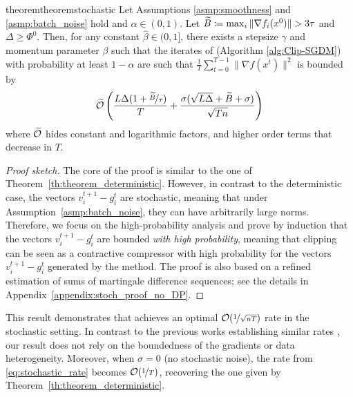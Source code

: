 \documentclass[a4paper,11pt]{article}
\begin{document}
\begin{restatable}[Simplified]{theorem}{theoremstochastic}\label{th:theorem_stochastic}
    Let Assumptions \ref{asmp:smoothness} and \ref{asmp:batch_noise} hold and $\alpha \in (0,1)$.  Let $\widetilde{B} \coloneqq \max_i\|\nabla f_i(x^0)\| > 3\tau$ and $\Delta \ge \Phi^0.$ Then, for any constant $\hat{\beta}\in (0,1]$, there exists a stepsize $\gamma$ and momentum parameter $\beta$ such that the iterates of  (Algorithm \ref{alg:Clip-SGDM}) with probability at least $1-\alpha$ are such that $\frac{1}{T}\sum_{t=0}^{T-1}\|\nabla f(x^t)\|^2$ is bounded by
    \begin{equation}
        \widetilde{\mathcal O}\left(\frac{L\Delta(1 + \nicefrac{\widetilde{B}}{\tau})}{T} 
        + \frac{\sigma(\sqrt{L\Delta} + \widetilde{B}+\sigma)}{\sqrt{Tn}}\right) \label{eq:stochastic_rate}
    \end{equation}
    where $\widetilde{\mathcal O}$ hides constant and logarithmic factors, and higher order terms that decrease in $T$.
\end{restatable}
\begin{proof}[Proof sketch]
    The core of the proof is similar to the one of Theorem~\ref{th:theorem_deterministic}. However, in contrast to the deterministic case, the vectors $v_i^{t+1} - g_i^t$ are stochastic, meaning that under Assumption~\ref{asmp:batch_noise}, they can have arbitrarily large norms. Therefore, we focus on the high-probability analysis and prove by induction that the vectors $v_i^{t+1} - g_i^t$ are bounded \emph{with high probability}, meaning that clipping can be seen as a contractive compressor with high probability for the vectors $v_i^{t+1} - g_i^t$ generated by the method. The proof is also based on a refined estimation of sums of martingale difference sequences; see the details in Appendix~\ref{appendix:stoch_proof_no_DP}. 
\end{proof}
This result demonstrates that  achieves an optimal $\mathcal O(\nicefrac{1}{\sqrt{nT}})$ \citep{arjevani2023lower} rate in the stochastic setting. In contrast to the previous works establishing similar rates \citep{liu2022communication, noble2022differentially, allouah2024privacy}, our result does not rely on the boundedness of the gradients or data heterogeneity. 
Moreover, when $\sigma = 0$ (no stochastic noise), the rate from \eqref{eq:stochastic_rate} becomes $\mathcal O(\nicefrac{1}{T})$, recovering the one given by Theorem~\ref{th:theorem_deterministic}. 
\end{document}
